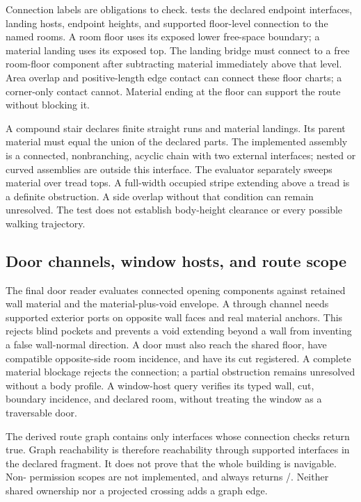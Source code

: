 Connection labels are obligations to check.  tests the declared endpoint interfaces, landing hosts, endpoint heights, and supported floor-level connection to the named rooms. A room floor uses its exposed lower free-space boundary; a material landing uses its exposed top. The landing bridge must connect to a free room-floor component after subtracting material immediately above that level. Area overlap and positive-length edge contact can connect these floor charts; a corner-only contact cannot. Material ending at the floor can support the route without blocking it.

A compound stair declares finite straight runs and material landings. Its parent material must equal the union of the declared parts. The implemented assembly is a connected, nonbranching, acyclic chain with two external interfaces; nested or curved assemblies are outside this interface. The evaluator separately sweeps material over tread tops. A full-width occupied stripe extending above a tread is a definite obstruction. A side overlap without that condition can remain unresolved. The test does not establish body-height clearance or every possible walking trajectory.

\subsection{Door channels, window hosts, and route scope}
The final door reader evaluates connected opening components against retained wall material and the material-plus-void envelope. A through channel needs supported exterior ports on opposite wall faces and real material anchors. This rejects blind pockets and prevents a void extending beyond a wall from inventing a false wall-normal direction. A door must also reach the shared floor, have compatible opposite-side room incidence, and have its cut registered. A complete material blockage rejects the connection; a partial obstruction remains unresolved without a body profile. A window-host query verifies its typed wall, cut, boundary incidence, and declared room, without treating the window as a traversable door.

The derived route graph contains only interfaces whose connection checks return true. Graph reachability is therefore reachability through supported interfaces in the declared fragment. It does not prove that the whole building is navigable. Non- permission scopes are not implemented, and  always returns /\neval. Neither shared ownership nor a projected crossing adds a graph edge.

